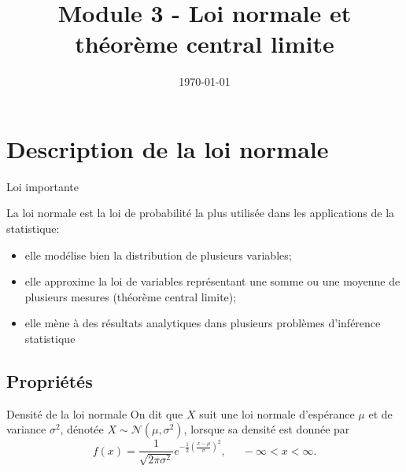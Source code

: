\documentclass{BeamerTemplate}
\title{Module 3 - Loi normale et théorème central limite}
\date{\today}
\begin{document}
\begin{frame}[t]
  \titlepage
\end{frame}








\section{Description de la loi normale}

\begin{frame}[t]{Loi importante}

La loi normale est  la loi de probabilité la plus utilisée dans les
applications de la statistique: %

\begin{itemize}
\item elle modélise bien la distribution de plusieurs variables;%
\item elle approxime la loi de  variables représentant une somme ou une moyenne de plusieurs mesures (théorème central limite);
\item elle mène à des résultats analytiques dans plusieurs problèmes d'inférence statistique
\end{itemize}
\end{frame}

\subsection{Propriétés}

\begin{frame}[t]{Densité de la loi normale}
On dit que $X$ suit une loi normale d'espérance $\mu$ et de variance $\sigma^2$, dénotée
\alert{$X\sim \mathcal{N}(\mu,\sigma^2)$}, lorsque sa densité est donnée par
$$f(x)=\frac{1}{\sqrt{2\pi\sigma^2}}
e^{-\frac{1}{2}\left(\frac{x-\mu}{\sigma}\right)^2},\ \ \quad
-\infty<x<\infty.$$

\begin{center}
\end{center}

\end{frame}
\end{document}
